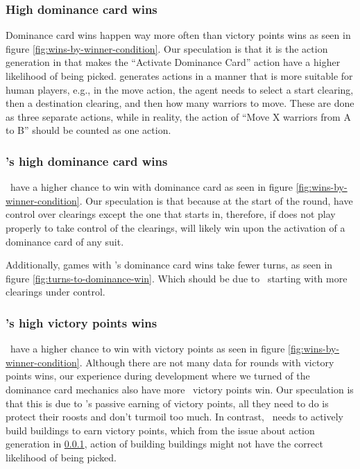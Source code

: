 \subsubsection{High dominance card wins} \label{high-dominance-card-wins}
Dominance card wins happen way more often than victory points wins as seen in figure \ref{fig:wins-by-winner-condition}. Our speculation is that it is the action generation in \RootOurs{} that makes the ``Activate Dominance Card'' action have a higher likelihood of being picked. \RootOurs{} generates actions in a manner that is more suitable for human players, e.g., in the move action, the agent needs to select a start clearing, then a destination clearing, and then how many warriors to move. These are done as three separate actions, while in reality, the action of ``Move X warriors from A to B'' should be counted as one action.

\subsubsection{\Marquise's high dominance card wins}
\Marquise \ have a higher chance to win with dominance card as seen in figure \ref{fig:wins-by-winner-condition}. Our speculation is that because at the start of the round, \Marquise{} have control over clearings except the one that \Eyrie{} starts in, therefore, if \Eyrie{} does not play properly to take control of the clearings, \Marquise{} will likely win upon the activation of a dominance card of any suit.

Additionally, games with \Marquise's dominance card wins take fewer turns, as seen in figure \ref{fig:turns-to-dominance-win}. Which should be due to \Marquise \ starting with more clearings under control.

\subsubsection{\Eyrie's high victory points wins}
\Eyrie \ have a higher chance to win with victory points as seen in figure \ref{fig:wins-by-winner-condition}. Although there are not many data for rounds with victory points wins, our experience during development where we turned of the dominance card mechanics also have more \Eyrie \ victory points win. Our speculation is that this is due to \Eyrie's passive earning of victory points, all they need to do is protect their roosts and don't turmoil too much. In contrast, \Marquise \ needs to actively build buildings to earn victory points, which from the issue about action generation in \ref{high-dominance-card-wins}, action of building buildings might not have the correct likelihood of being picked.

